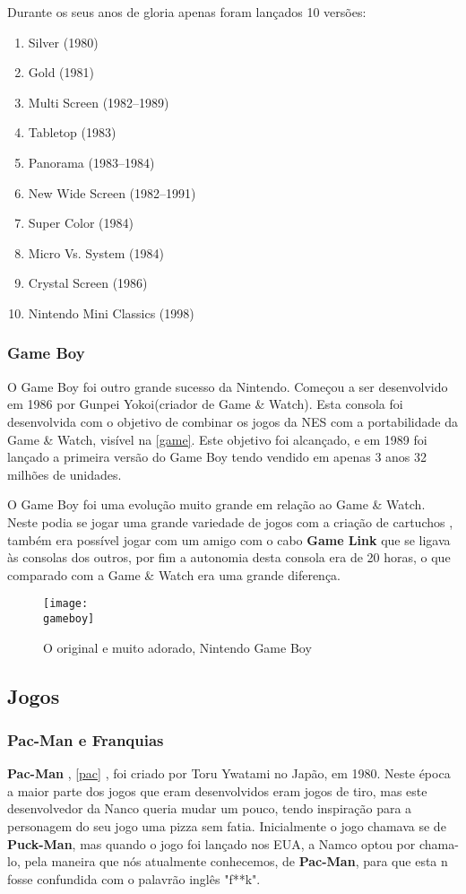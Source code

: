 \documentclass{report}
\begin{document}
 Durante os seus anos de gloria apenas foram lançados 10 versões:
 \begin{enumerate}
     \item Silver (1980)
     \item Gold (1981)
     \item Multi Screen (1982–1989)
     \item Tabletop (1983)
     \item Panorama (1983–1984)
     \item New Wide Screen (1982–1991)
     \item Super Color (1984)
     \item Micro Vs. System (1984)
     \item Crystal Screen (1986)
     \item Nintendo Mini Classics (1998)
 \end{enumerate}
 
 \subsubsection{Game Boy}
\label{subsubsec.Game Boy}
 O Game Boy foi outro grande sucesso da Nintendo. Começou a ser desenvolvido em 1986 por Gunpei Yokoi(criador de Game \& Watch). Esta consola foi desenvolvida com o objetivo de combinar os jogos da NES com a portabilidade da Game \& Watch, visível na \autoref{game}. Este objetivo foi alcançado, e em 1989 foi lançado a primeira versão do Game Boy tendo vendido em apenas 3 anos 32 milhões de unidades.
 
 O Game Boy foi uma evolução muito grande em relação ao Game \& Watch. Neste podia se jogar uma grande variedade de jogos com a criação de cartuchos , também era possível jogar com um amigo com o cabo \textbf{Game Link} que se ligava às consolas dos outros, por fim a autonomia desta consola era de 20 horas, o que comparado com a Game \& Watch era uma grande diferença.
 
 \begin{figure}[h]
\center
\texttt{[image: \\gameboy]}
\caption{O original e muito adorado, Nintendo Game Boy \cite{gameboy}}
\label{game}
\end{figure}



\subsection{Jogos}
\label{subsec.jogos2}
\subsubsection{Pac-Man e Franquias}
\label{subsubsec.Pac-Man e franquias}
\textbf{Pac-Man} , \autoref{pac} , foi criado por Toru Ywatami no Japão, em 1980. Neste época a maior parte dos jogos que eram desenvolvidos eram jogos de tiro, mas este desenvolvedor da Nanco queria mudar um pouco, tendo inspiração para a personagem do seu jogo uma pizza sem fatia. Inicialmente o jogo chamava se de \textbf{Puck-Man}, mas quando o jogo foi lançado nos EUA, a  Namco optou por chama-lo, pela maneira que nós atualmente conhecemos, de \textbf{Pac-Man}, para que esta n fosse confundida com o palavrão inglês "f**k".
\end{document}
